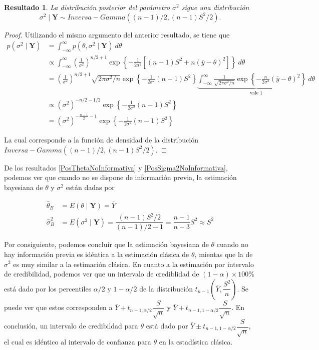 \documentclass[
  10pt,
  spanish,
]{book}
\newtheorem{proposition}{Resultado}[chapter]
\theoremstyle{definition}
\theoremstyle{definition}
\theoremstyle{definition}
\theoremstyle{definition}
\theoremstyle{remark}
\begin{document}
\begin{proposition}
\protect\hypertarget{prp:PosSigma2NoInformativa}{}{\label{prp:PosSigma2NoInformativa} }La distribución posterior del parámetro \(\sigma^2\) sigue una distribución
\begin{equation*}
\sigma^2 \mid \mathbf{Y} \sim Inversa-Gamma((n-1)/2,(n-1)S^2/2).
\end{equation*}
\end{proposition}

\begin{proof}
{}Utilizando el mismo argumento del anterior resultado, se tiene que
\begin{align*}
p(\sigma^2 \mid \mathbf{Y})&= \int_{-\infty}^{\infty} p(\theta,\sigma^2 \mid \mathbf{Y}) \ d\theta \\
& \propto \int_{-\infty}^{\infty} \left(\frac{1}{\sigma^2}\right)^{n/2+1}
\exp\left\{-\frac{1}{2\sigma^2}\left[(n-1)S^2+n(\bar{y}-\theta)^2\right]\right\} \ d\theta \\
& = \left(\frac{1}{\sigma^2}\right)^{n/2+1} \sqrt{2\pi\sigma^2/n}\exp\left\{-\frac{1}{2\sigma^2}(n-1)S^2\right\}\underbrace{\int_{-\infty}^{\infty} \frac{1}{\sqrt{2\pi\sigma^2/n}} \exp\left\{-\frac{n}{2\sigma^2}(\bar{y}-\theta)^2\right\} \ d\theta}_{\text{vale $1$}} \\
& \propto (\sigma^2)^{-n/2-1/2}\exp\left\{-\frac{1}{2\sigma^2}(n-1)S^2\right\}\\
&= (\sigma^2)^{-\frac{n-1}{2}-1}\exp\left\{-\frac{1}{2\sigma^2}(n-1)S^2\right\}
\end{align*}

La cual corresponde a la función de densidad de la distribución \(Inversa-Gamma((n-1)/2,(n-1)S^2/2)\).
\end{proof}

De los resultados \ref{PosThetaNoInformativa} y \ref{PosSigma2NoInformativa}, podemos ver que cuando no se dispone de información previa, la estimación bayesiana de \(\theta\) y \(\sigma^2\) están dadas por

\begin{align*}
\hat{\theta}_B&=E(\theta\mid\mathbf{Y})=\bar{Y}\\
\hat{\sigma}^2_B&=E(\sigma^2\mid\mathbf{Y})=\dfrac{(n-1)S^2/2}{(n-1)/2-1}=\dfrac{n-1}{n-3}S^2\approx S^2
\end{align*}

Por consiguiente, podemos concluir que la estimación bayesiana de \(\theta\) cuando no hay información previa es idéntica a la estimación clásica de \(\theta\), mientas que la de \(\sigma^2\) es muy similar a la estimación clásica. En cuanto a la estimación por intervalo de credibilidad, podemos ver que un intervalo de crediblidad de \((1-\alpha)\times 100\%\) está dado por los percentiles \(\alpha/2\) y \(1-\alpha/2\) de la distribución \(t_{n-1}\left(\bar{Y},\dfrac{S^2}{n}\right)\). Se puede ver que estos corresponden a \(\bar{Y}+t_{n-1,\alpha/2}\dfrac{S}{\sqrt{n}}\) y \(\bar{Y}+t_{n-1,1-\alpha/2}\dfrac{S}{\sqrt{n}}\). En conclusión, un intervalo de credibildad para \(\theta\) está dado por \(\bar{Y}\pm t_{n-1,1-\alpha/2}\dfrac{S}{\sqrt{n}}\), el cual es idéntico al intervalo de confianza para \(\theta\) en la estadística clásica.
\end{document}
